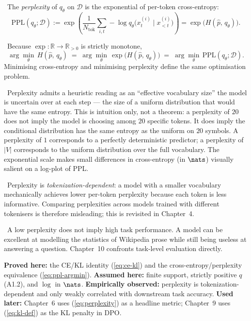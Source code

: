 \Def\ The \emph{perplexity} of $q_\theta$ on $\mathcal{D}$ is the
exponential of per-token cross-entropy:
\begin{equation}
\mathrm{PPL}(q_\theta; \mathcal{D})
  := \exp\!\left( \frac{1}{N_{\mathrm{tok}}} \sum_{i,t}
       -\log q_\theta\!\big(x^{(i)}_t \mid x^{(i)}_{<t}\big) \right)
  = \exp\!\big( H(\hat p,\, q_\theta) \big).
\label{eq:perplexity}
\end{equation}

\Ident\ Because $\exp : \mathbb{R} \to \mathbb{R}_{>0}$ is strictly
monotone,
\begin{equation}
\arg\min_\theta\, H(\hat p,\, q_\theta)
  \;=\; \arg\min_\theta\, \exp\!\big(H(\hat p,\, q_\theta)\big)
  \;=\; \arg\min_\theta\, \mathrm{PPL}(q_\theta; \mathcal{D}).
\label{eq:ppl-argmin}
\end{equation}
Minimising cross-entropy and minimising perplexity define the same
optimisation problem.

\Cons\ Perplexity admits a heuristic reading as an ``effective
vocabulary size'' the model is uncertain over at each step --- the
size of a uniform distribution that would have the same entropy.
This is intuition only, not a theorem: a perplexity of $20$ does
not imply the model is choosing among $20$ specific tokens. It does
imply the conditional distribution has the same entropy as the
uniform on $20$ symbols. A perplexity of $1$ corresponds to a
perfectly deterministic predictor; a perplexity of $|V|$ corresponds
to the uniform distribution over the full vocabulary. The
exponential scale makes small differences in cross-entropy (in $\nats$)
visually salient on a log-plot of PPL.

\Emp\ Perplexity is \emph{tokenization-dependent}: a model with a
smaller vocabulary mechanically achieves lower per-token perplexity
because each token is less informative. Comparing perplexities across
models trained with different tokenisers is therefore misleading; this
is revisited in Chapter~4.

\Emp\ A low perplexity does not imply high task performance. A model
can be excellent at modelling the statistics of Wikipedia prose while
still being useless at answering a question. Chapter~10 confronts task-level
evaluation directly.

\begin{provedassumed}
\textbf{Proved here:} the CE/KL identity (\ref{eq:ce-kl}) and the
cross-entropy/perplexity equivalence (\ref{eq:ppl-argmin}).
\textbf{Assumed here:} finite support, strictly positive $q$ (A1.2),
and $\log$ in $\nats$.
\textbf{Empirically observed:} perplexity is tokenization-dependent and
only weakly correlated with downstream task accuracy.
\textbf{Used later:} Chapter~6 uses (\ref{eq:perplexity}) as a headline
metric; Chapter~9 uses (\ref{eq:kl-def}) as the KL penalty in DPO.
\end{provedassumed}


